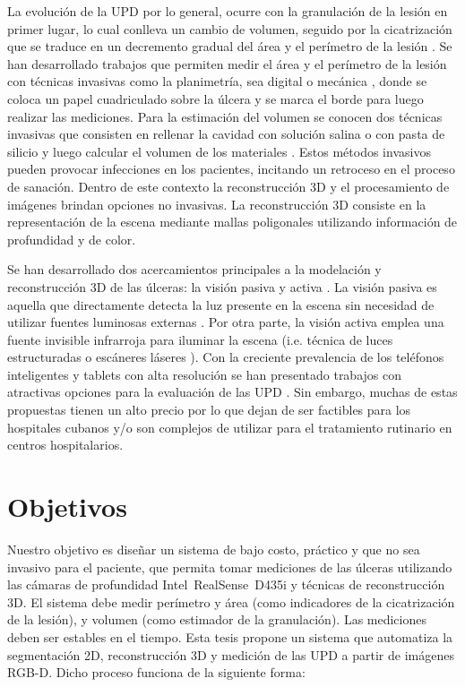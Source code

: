 La evolución de la UPD por lo general, ocurre con la granulación de la lesión en primer lugar, lo cual conlleva un cambio de volumen, seguido por la cicatrización que se traduce en un decremento gradual del área y el perímetro de la lesión  \cite{kecelj2007measurement}. Se han desarrollado trabajos que permiten medir el área y el perímetro de la lesión con técnicas invasivas como la planimetría, sea digital o mecánica \cite{oien2002measuring}, donde se coloca un papel cuadriculado sobre la úlcera y se marca el borde para luego realizar las mediciones. Para la estimación del volumen se conocen dos técnicas invasivas que consisten en rellenar la cavidad con solución salina o con pasta de silicio y luego calcular el volumen de los materiales \cite{langemo2008measuring}. Estos métodos invasivos pueden provocar infecciones en los pacientes, incitando un retroceso en el proceso de sanación. Dentro de este contexto la reconstrucción 3D y el procesamiento de imágenes brindan opciones no invasivas. La reconstrucción 3D consiste en la representación de la escena mediante mallas poligonales utilizando información de profundidad y de color.

Se han desarrollado dos acercamientos principales a la modelación y reconstrucción 3D de las úlceras: la visión pasiva y activa \cite{zenteno2018volumetric}. La visión pasiva es aquella que directamente detecta la luz presente en la escena sin necesidad de utilizar fuentes luminosas externas \cite{malian2004medphos, plassmann1998mavis}. Por otra parte, la visión activa emplea una fuente invisible infrarroja para iluminar la escena (i.e. técnica de luces estructuradas \cite{filko2018wound, ching2022segm3d, ozturk1996new} o escáneres láseres \cite{callieri2003derma, krouskop2002noncontact}). Con la creciente prevalencia de los teléfonos inteligentes y tablets con alta resolución se han presentado trabajos con atractivas opciones para la evaluación de las UPD \cite{foltynski2014new, wang2014smartphone}. Sin embargo, muchas de estas propuestas tienen un alto precio por lo que dejan de ser factibles para los hospitales cubanos y/o son complejos de utilizar para el tratamiento rutinario en centros hospitalarios.

\section*{Objetivos}

Nuestro objetivo es diseñar un sistema de bajo costo, práctico y que no sea invasivo para el paciente, que permita tomar mediciones de las úlceras utilizando las cámaras de profundidad Intel~\textregistered RealSense~\texttrademark D435i y técnicas de reconstrucción 3D. El sistema debe medir perímetro y área (como indicadores de la cicatrización de la lesión), y volumen (como estimador de la granulación). Las mediciones deben ser estables en el tiempo. Esta tesis propone un sistema que automatiza la segmentación 2D, reconstrucción 3D y medición de las UPD a partir de imágenes RGB-D. Dicho proceso funciona de la siguiente forma: 

